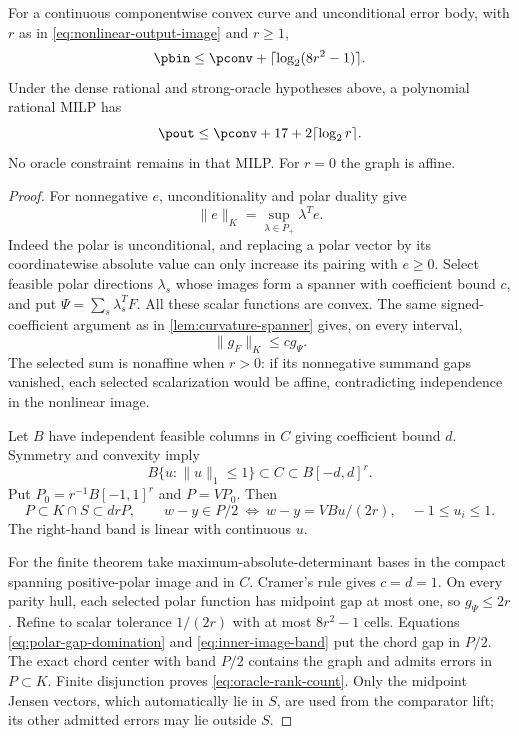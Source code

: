 \begin{theorem}\label{thm:vector-oracle-rank}
For a continuous componentwise convex curve and unconditional error body,
with $r$ as in \eqref{eq:nonlinear-output-image} and $r\ge1$,
\begin{equation}\label{eq:oracle-rank-count}
 \pbin\le\pconv+\lceil\log_2(8r^2-1)\rceil.
\end{equation}
Under the dense rational and strong-oracle hypotheses above, a polynomial
rational MILP has
\begin{equation}\label{eq:oracle-rank-compiled}
 \pout\le\pconv+17+2\lceil\log_2r\rceil.
\end{equation}
No oracle constraint remains in that MILP. For $r=0$ the graph is affine.
\end{theorem}
\begin{proof}
For nonnegative $e$, unconditionality and polar duality give
\[
 \|e\|_K=\sup_{\lambda\in P_+}\lambda^Te.
\]
Indeed the polar is unconditional, and replacing a polar vector by
its coordinatewise absolute value can only increase its pairing with
$e\ge0$. Select feasible polar directions $\lambda_s$ whose images
form a spanner with coefficient bound $c$, and put
$\Psi=\sum_s\lambda_s^TF$. All these scalar functions are convex.
The same signed-coefficient argument as in \cref{lem:curvature-spanner}
gives, on every interval,
\begin{equation}\label{eq:polar-gap-domination}
 \|g_F\|_K\le c g_\Psi.
\end{equation}
The selected sum is nonaffine when $r>0$: if its nonnegative summand
gaps vanished, each selected scalarization would be affine, contradicting
independence in the nonlinear image.

Let $B$ have independent feasible columns in $C$ giving coefficient
bound $d$. Symmetry and convexity imply
\[
 B\{u:\|u\|_1\le1\}\subset C\subset B[-d,d]^r.
\]
Put $P_0=r^{-1}B[-1,1]^r$ and $P=VP_0$. Then
\begin{equation}\label{eq:inner-image-band}
 P\subset K\cap S\subset drP,
 \qquad w-y\in P/2
 \ \Longleftrightarrow\ w-y=VBu/(2r),\quad -1\le u_i\le1.
\end{equation}
The right-hand band is linear with continuous $u$.

For the finite theorem take maximum-absolute-determinant bases in the
compact spanning positive-polar image and in $C$. Cramer's rule gives
$c=d=1$. On every parity hull, each selected polar function has midpoint
gap at most one, so $g_\Psi\le2r$. Refine to scalar tolerance
$1/(2r)$ with at most $8r^2-1$ cells. Equations
\eqref{eq:polar-gap-domination} and \eqref{eq:inner-image-band} put
the chord gap in $P/2$. The exact chord center with band $P/2$ contains
the graph and admits errors in $P\subset K$. Finite disjunction proves
\eqref{eq:oracle-rank-count}. Only the midpoint Jensen vectors, which
automatically lie in $S$, are used from the comparator lift; its other
admitted errors may lie outside $S$.


\end{proof}
